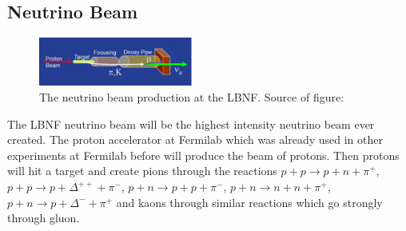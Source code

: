 \subsection{Neutrino Beam}

\begin{figure}
\caption{The neutrino beam production at the LBNF. Source of figure: \cite{ref_LBNFweb}}
\label{fig:LBNF_nuBeam}
\centering
\includegraphics[width=0.45\textwidth, keepaspectratio=true]{figs/LBNF_nuBeam.png}  
\end{figure}


The LBNF neutrino beam will be the highest intensity neutrino beam ever created. The proton accelerator at Fermilab which was already used in other experiments at Fermilab before will produce the beam of protons. Then protons will hit a target and create pions through the reactions $p+p \rightarrow p+n+\pi^+$, $p+p \rightarrow p+\Delta^{++}+\pi^-$, $p+n \rightarrow p+p+\pi^-$, $p+n \rightarrow n+n+\pi^+$, $p+n \rightarrow p+\Delta^{-}+\pi^+$ and kaons through similar reactions which go strongly through gluon. 



